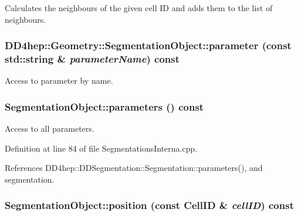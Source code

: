 Calculates the neighbours of the given cell ID and adds them to the list of neighbours. \hypertarget{class_d_d4hep_1_1_geometry_1_1_segmentation_object_a5b3ad09c737314600b6c8b3c41bdb9a9}{
\subsubsection[{parameter}]{ DD4hep::Geometry::SegmentationObject::parameter (const std::string \& {\em parameterName}) const}}
\label{class_d_d4hep_1_1_geometry_1_1_segmentation_object_a5b3ad09c737314600b6c8b3c41bdb9a9}


Access to parameter by name. \hypertarget{class_d_d4hep_1_1_geometry_1_1_segmentation_object_a1ca8bae37e4cb457192779046717aa19}{
\subsubsection[{parameters}]{ SegmentationObject::parameters () const}}
\label{class_d_d4hep_1_1_geometry_1_1_segmentation_object_a1ca8bae37e4cb457192779046717aa19}


Access to all parameters. 

Definition at line 84 of file SegmentationsInterna.cpp.

References DD4hep::DDSegmentation::Segmentation::parameters(), and segmentation.\hypertarget{class_d_d4hep_1_1_geometry_1_1_segmentation_object_a48c53872382d4ecd3f87ea82298a435f}{
\subsubsection[{position}]{ SegmentationObject::position (const CellID \& {\em cellID}) const}}
\label{class_d_d4hep_1_1_geometry_1_1_segmentation_object_a48c53872382d4ecd3f87ea82298a435f}


